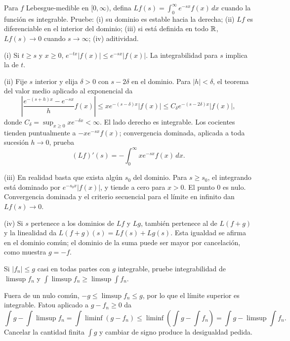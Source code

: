 \begin{ejercicio}\label{ej:v2-l10-3}
Para $f$ Lebesgue-medible en $[0,\infty)$, defina $Lf(s)=\int_0^\infty e^{-sx}f(x)\,dx$ cuando la función es integrable. Pruebe: (i) su dominio es estable hacia la derecha; (ii) $Lf$ es diferenciable en el interior del dominio; (iii) si está definida en todo $\mathbb R$, $Lf(s)\to0$ cuando $s\to\infty$; (iv) aditividad.
\end{ejercicio}
\begin{solucion}
(i) Si $t\ge s$ y $x\ge0$, $e^{-tx}|f(x)|\le e^{-sx}|f(x)|$. La integrabilidad para $s$ implica la de $t$.

(ii) Fije $s$ interior y elija $\delta>0$ con $s-2\delta$ en el dominio. Para $|h|<\delta$, el teorema del valor medio aplicado al exponencial da
\[\left|\frac{e^{-(s+h)x}-e^{-sx}}h f(x)\right|\le x e^{-(s-\delta)x}|f(x)|
\le C_\delta e^{-(s-2\delta)x}|f(x)|,\]
donde $C_\delta=\sup_{x\ge0}xe^{-\delta x}<\infty$. El lado derecho es integrable. Los cocientes tienden puntualmente a $-xe^{-sx}f(x)$; convergencia dominada, aplicada a toda sucesión $h\to0$, prueba
\[(Lf)'(s)=-\int_0^\infty xe^{-sx}f(x)\,dx.\]

(iii) En realidad basta que exista algún $s_0$ del dominio. Para $s\ge s_0$, el integrando está dominado por $e^{-s_0x}|f(x)|$, y tiende a cero para $x>0$. El punto $0$ es nulo. Convergencia dominada y el criterio secuencial para el límite en infinito dan $Lf(s)\to0$.

(iv) Si $s$ pertenece a los dominios de $Lf$ y $Lg$, también pertenece al de $L(f+g)$ y la linealidad da $L(f+g)(s)=Lf(s)+Lg(s)$. Esta igualdad se afirma en el dominio común; el dominio de la suma puede ser mayor por cancelación, como muestra $g=-f$.
\end{solucion}

\begin{ejercicio}\label{ej:v2-l10-4}
Si $|f_n|\le g$ casi en todas partes con $g$ integrable, pruebe integrabilidad de $\limsup f_n$ y $\int\limsup f_n\ge\limsup\int f_n$.
\end{ejercicio}
\begin{solucion}
Fuera de un nulo común, $-g\le\limsup f_n\le g$, por lo que el límite superior es integrable. Fatou aplicado a $g-f_n\ge0$ da
\[\int g-\int\limsup f_n=\int\liminf(g-f_n)
\le\liminf\left(\int g-\int f_n\right)=\int g-\limsup\int f_n.\]
Cancelar la cantidad finita $\int g$ y cambiar de signo produce la desigualdad pedida.
\end{solucion}

